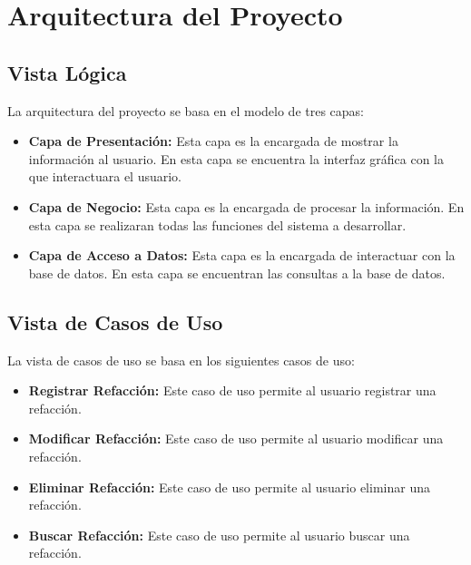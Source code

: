 \section*{Arquitectura del Proyecto}

\subsection*{Vista Lógica}
La arquitectura del proyecto se basa en el modelo de tres capas: 
\begin{itemize}
    \item \textbf{Capa de Presentación:} Esta capa es la encargada de mostrar la información al usuario. 
    En esta capa se encuentra la interfaz gráfica con la que interactuara el usuario.
    \newline
    \begin{center}
            
    \newline
    \end{center}
     \item \textbf{Capa de Negocio:} Esta capa es la encargada de procesar la información. 
    En esta capa se realizaran todas las funciones del sistema a desarrollar.
    \newline
     \begin{center}
       
    \newline
    \end{center}
    \item \textbf{Capa de Acceso a Datos:} Esta capa es la encargada de interactuar con la base de datos. 
    En esta capa se encuentran las consultas a la base de datos.
    \newline
    \begin{center}

        \newline
    \end{center}
\end{itemize}

\subsection*{Vista de Casos de Uso}

    La vista de casos de uso se basa en los siguientes casos de uso:
    \begin{itemize}
        \item \textbf{Registrar Refacción:} Este caso de uso permite al usuario registrar una refacción.
        \item \textbf{Modificar Refacción:} Este caso de uso permite al usuario modificar una refacción.
        \item \textbf{Eliminar Refacción:} Este caso de uso permite al usuario eliminar una refacción.
        \item \textbf{Buscar Refacción:} Este caso de uso permite al usuario buscar una refacción.
    \end{itemize}

